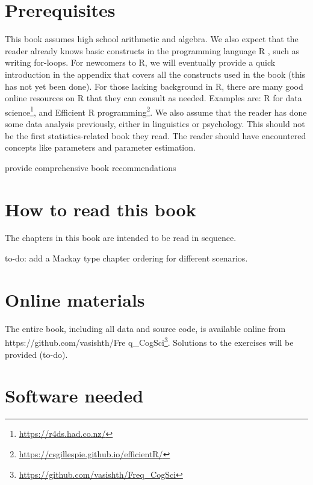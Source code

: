 \documentclass[12pt,]{krantz}
\makeatletter
\renewcommand{\href}[2]{#2\footnote{\url{#1}}}
\newenvironment{kframe}{%
\medskip{}
\setlength{\fboxsep}{.8em}
 \def\at@end@of@kframe{}%
 \ifinner\ifhmode%
  \def\at@end@of@kframe{\end{minipage}}%
  \begin{minipage}{\columnwidth}%
 \fi\fi%
 \def\FrameCommand##1{\hskip\@totalleftmargin \hskip-\fboxsep
 \colorbox{shadecolor}{##1}\hskip-\fboxsep
     \hskip-\linewidth \hskip-\@totalleftmargin \hskip\columnwidth}%
 \MakeFramed {\advance\hsize-\width
   \@totalleftmargin\z@ \linewidth\hsize
   \@setminipage}}%
 {\par\unskip\endMakeFramed%
 \at@end@of@kframe}
\newenvironment{rmdblock}[1]
  {
  \begin{itemize}
  \renewcommand{\labelitemi}{
    \raisebox{-.7\height}[0pt][0pt]{
      {\setkeys{Gin}{width=3em,keepaspectratio}\texttt{[image: images/\#1]}}
    }
  }
  \setlength{\fboxsep}{1em}
  \begin{kframe}
  \item
  }
  {
  \end{kframe}
  \end{itemize}
  }
\newenvironment{rmdnote}
  {\begin{rmdblock}{note}}
  {\end{rmdblock}}
\makeatother
\begin{document}
\hypertarget{prerequisites}{%
\section{Prerequisites}\label{prerequisites}}

This book assumes high school arithmetic and algebra. We also expect that the reader already knows basic constructs in the programming language R \citep{R-base}, such as writing for-loops. For newcomers to R, we will eventually provide a quick introduction in the appendix that covers all the constructs used in the book (this has not yet been done). For those lacking background in R, there are many good online resources on R that they can consult as needed. Examples are: \href{https://r4ds.had.co.nz/}{R for data science}, and \href{https://csgillespie.github.io/efficientR/}{Efficient R programming}. We also assume that the reader has done some data analysis previously, either in linguistics or psychology. This should not be the first statistics-related book they read. The reader should have encountered concepts like parameters and parameter estimation.

\begin{rmdnote}
provide comprehensive book recommendations
\end{rmdnote}

\hypertarget{how-to-read-this-book}{%
\section{How to read this book}\label{how-to-read-this-book}}

The chapters in this book are intended to be read in sequence.

to-do: add a Mackay type chapter ordering for different scenarios.

\hypertarget{online-materials}{%
\section{Online materials}\label{online-materials}}

The entire book, including all data and source code, is available online from \href{https://github.com/vasishth/Freq_CogSci}{https://github.com/vasishth/Fre q\_CogSci}. Solutions to the exercises will be provided (to-do).

\hypertarget{software-needed}{%
\section{Software needed}\label{software-needed}}
\end{document}
